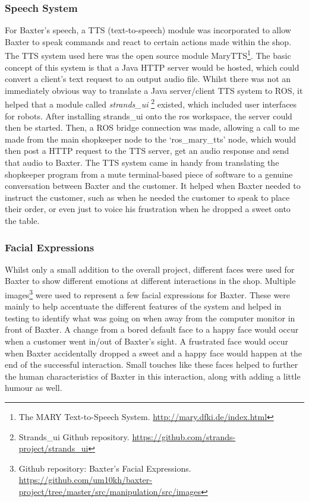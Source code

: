 \subsubsection{Speech System}
For Baxter's speech, a TTS (text-to-speech) module was incorporated to allow Baxter to speak commands and react to certain actions made within the shop. The TTS system used here was the open source module MaryTTS\footnote{The MARY Text-to-Speech System. \url{http://mary.dfki.de/index.html}}. The basic concept of this system is that a Java HTTP server would be hosted, which could convert a client's text request to an output audio file. Whilst there was not an immediately obvious way to translate a Java server/client TTS system to ROS, it helped that a module called \textit{strands\_ui} \footnote{Strands\_ui Github repository. \url{https://github.com/strands-project/strands\_ui}}  existed, which included user interfaces for robots. After installing strands\_ui onto the ros workspace, the server could then be started. Then, a ROS bridge connection was made, allowing a call to me made from the main shopkeeper node to the `ros\_mary\_tts' node, which would then post a HTTP request to the TTS server, get an audio response and send that audio to Baxter.\newline\newline
The TTS system came in handy from translating the shopkeeper program from a mute terminal-based piece of software to a genuine conversation between Baxter and the customer. It helped when Baxter needed to instruct the customer, such as when he needed the customer to speak to place their order, or even just to voice his frustration when he dropped a sweet onto the table.
\subsubsection{Facial Expressions}
Whilst only a small addition to the overall project, different faces were used for Baxter to show different emotions at different interactions in the shop. Multiple images\footnote{Github repository: Baxter's Facial Expressions. \url{https://github.com/um10kh/baxter-project/tree/master/src/manipulation/src/images}} were used to represent a few facial expressions for Baxter. These were mainly to help accentuate the different features of the system and helped in testing to identify what was going on when away from the computer monitor in front of Baxter. A change from a bored default face to a happy face would occur when a customer went in/out of Baxter's sight. A frustrated face would occur when Baxter accidentally dropped a sweet and a happy face would happen at the end of the successful interaction. Small touches like these faces helped to further the human characteristics of Baxter in this interaction, along with adding a little humour as well.